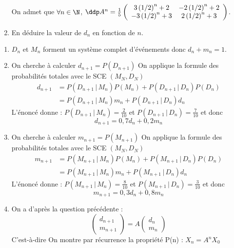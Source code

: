\documentclass[a4paper, 11pt,reqno]{article}
\begin{document}
\begin{exercice}
\begin{enumerate}

On admet que $\forall n\in \N$, $\ddp A^n=\frac{1}{5}\left(\begin{array}{ccc}
3\left( 1/2\right)^n +2 & -2\left( 1/2\right)^n +2\\
-3\left( 1/2\right)^n +3& 2\left( 1/2\right)^n +3
\end{array}
\right)$.
\item  En déduire la valeur de $d_n$ en fonction de $n$. 
\end{enumerate}
\end{exercice}



\begin{correction}
\begin{enumerate}
\item $D_n$ et $M_n$ forment un système complet d'événements donc $
d_n+m_n=1$. 
\item On cherche à calculer $d_{n+1} =P(D_{n+1})$ 
On applique la formule des probabilités totales avec le SCE $(M_N,D_N)$
\begin{align*}
d_{n+1} &= P(D_{n+1}\, |\, M_n) P(M_n) +P(D_{n+1}\, |\, D_n) P(D_n)\\
			&= P(D_{n+1}\, |\, M_n) m_n +P(D_{n+1}\, |\, D_n) d_n
\end{align*}
L'énoncé donne : $ P(D_{n+1}\, |\, M_n) = \frac{2}{10}$ et  $ P(D_{n+1}\, |\, D_n) = \frac{7}{10}$
et donc 
$$d_{n+1} = 0,7 d_n  +0,2 m_n$$

\item On cherche à calculer $m_{n+1} =P(M_{n+1})$ 
On applique la formule des probabilités totales avec le SCE $(M_N,D_N)$
\begin{align*}
m_{n+1} &= P(M_{n+1}\, |\, M_n) P(M_n) +P(M_{n+1}\, |\, D_n) P(D_n)\\
			&= P(M_{n+1}\, |\, M_n) m_n +P(M_{n+1}\, |\, D_n) d_n
\end{align*}
L'énoncé donne : $ P(M_{n+1}\, |\, M_n) = \frac{8}{10}$ et  $ P(M_{n+1}\, |\, D_n) = \frac{3}{10}$
et donc 
$$m_{n+1} = 0,3 d_n  +0,8 m_n$$

\item 
On  a d'après la question précédente :
$$\begin{pmatrix}
 d_{n+1}\\m_{n+1}\end{pmatrix}= A \begin{pmatrix}d_n\\m_n\end{pmatrix} $$
 C'est-à-dire 
On montre par récurrence la propriété P(n) : $X_n =A^n X_0$


\end{enumerate}
\end{correction}
\end{document}
